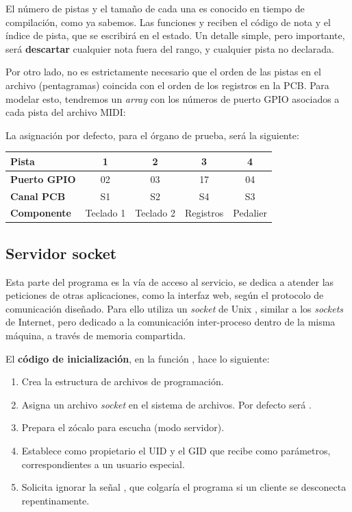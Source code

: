 El número de pistas y el tamaño de cada una es conocido en tiempo de compilación, como ya sabemos. Las funciones  y  reciben el código de nota y el índice de pista, que se escribirá en el estado. Un detalle simple, pero importante, será \textbf{descartar} cualquier nota fuera del rango, y cualquier pista no declarada.

Por otro lado, no es estrictamente necesario que el orden de las pistas en el archivo (pentagramas) coincida con el orden de los registros en la \acrshort{PCB}. Para modelar esto, tendremos un \textit{array} con los números de puerto \acrshort{GPIO} asociados a cada pista del archivo \acrshort{MIDI}:

La asignación por defecto, para el órgano de prueba, será la siguiente:

\smallskip

\begin{center}
	\begin{tabular}{|l|c|c|c|c|}
		\hline \textbf{Pista} & 1 & 2 & 3 & 4 \\
		\hline \textbf{Puerto GPIO} & 02 & 03 & 17 & 04 \\
		\hline \textbf{Canal PCB} & S1 & S2 & S4 & S3 \\
		\hline \textbf{Componente} & Teclado 1 & Teclado 2 & Registros & Pedalier \\
		\hline 
	\end{tabular}
	\smallskip
\end{center}

\smallskip

\subsection{Servidor socket}

Esta parte del programa es la vía de acceso al servicio, se dedica a atender las peticiones de otras aplicaciones, como la interfaz web, según el protocolo de comunicación diseñado. Para ello utiliza un \textit{socket} de Unix \cite{wiki_socket}, similar a los \textit{sockets} de Internet, pero dedicado a la comunicación inter-proceso dentro de la misma máquina, a través de memoria compartida.

El \textbf{código de inicialización}, en la función , hace lo siguiente:

\begin{enumerate}
	\item Crea la estructura de archivos de programación.
	\item Asigna un archivo \textit{socket} en el sistema de archivos. Por defecto será .
	\item Prepara el zócalo para escucha (modo servidor).
	\item Establece como propietario el \acrshort{UID} y el \acrshort{GID} que recibe como parámetros, correspondientes a un usuario especial.
	\item Solicita ignorar la señal , que colgaría el programa si un cliente se desconecta repentinamente.
\end{enumerate}

